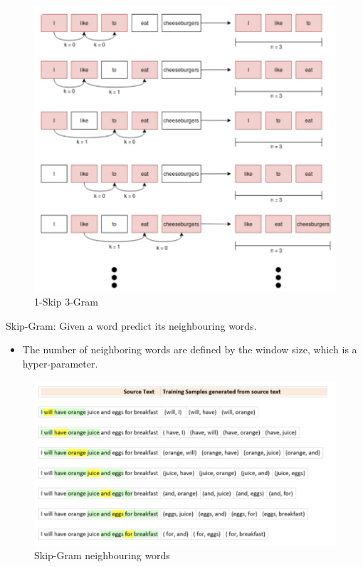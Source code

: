\begin{figure}[h!t]
    \centering
    \includegraphics[width=0.75\linewidth]{1skip3gram.png}
    \caption{1-Skip 3-Gram}
    \label{fig:enter-label}
\end{figure}

\begin{idea}
    Skip-Gram: Given a word predict its neighbouring words.
\end{idea}

\begin{itemize}
    \item The number of neighboring words are defined by the window size, which is a hyper-parameter.
\end{itemize}
\begin{figure}[h!t]
    \centering
    \includegraphics[width=0.65\linewidth]{neighbouringwords.png}
    \caption{Skip-Gram neighbouring words}
    \label{fig:enter-label}
\end{figure}

